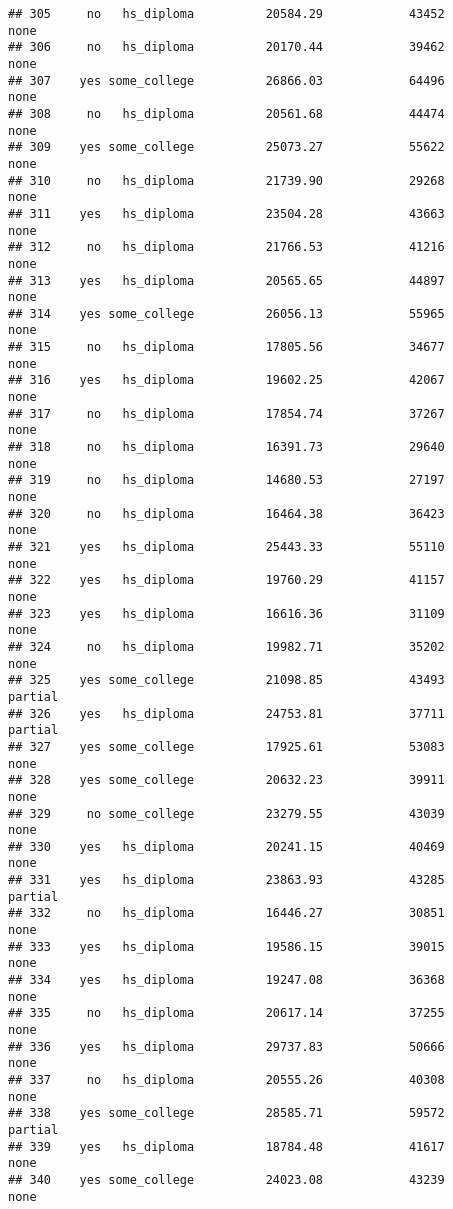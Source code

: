 \documentclass[
]{article}
\begin{document}
\begin{verbatim}
## 305     no   hs_diploma          20584.29            43452        none
## 306     no   hs_diploma          20170.44            39462        none
## 307    yes some_college          26866.03            64496        none
## 308     no   hs_diploma          20561.68            44474        none
## 309    yes some_college          25073.27            55622        none
## 310     no   hs_diploma          21739.90            29268        none
## 311    yes   hs_diploma          23504.28            43663        none
## 312     no   hs_diploma          21766.53            41216        none
## 313    yes   hs_diploma          20565.65            44897        none
## 314    yes some_college          26056.13            55965        none
## 315     no   hs_diploma          17805.56            34677        none
## 316    yes   hs_diploma          19602.25            42067        none
## 317     no   hs_diploma          17854.74            37267        none
## 318     no   hs_diploma          16391.73            29640        none
## 319     no   hs_diploma          14680.53            27197        none
## 320     no   hs_diploma          16464.38            36423        none
## 321    yes   hs_diploma          25443.33            55110        none
## 322    yes   hs_diploma          19760.29            41157        none
## 323    yes   hs_diploma          16616.36            31109        none
## 324     no   hs_diploma          19982.71            35202        none
## 325    yes some_college          21098.85            43493     partial
## 326    yes   hs_diploma          24753.81            37711     partial
## 327    yes some_college          17925.61            53083        none
## 328    yes some_college          20632.23            39911        none
## 329     no some_college          23279.55            43039        none
## 330    yes   hs_diploma          20241.15            40469        none
## 331    yes   hs_diploma          23863.93            43285     partial
## 332     no   hs_diploma          16446.27            30851        none
## 333    yes   hs_diploma          19586.15            39015        none
## 334    yes   hs_diploma          19247.08            36368        none
## 335     no   hs_diploma          20617.14            37255        none
## 336    yes   hs_diploma          29737.83            50666        none
## 337     no   hs_diploma          20555.26            40308        none
## 338    yes some_college          28585.71            59572     partial
## 339    yes   hs_diploma          18784.48            41617        none
## 340    yes some_college          24023.08            43239        none

\end{verbatim}
\end{document}
